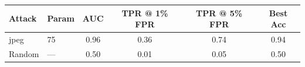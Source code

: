 \begin{tabular}{llcccc}
\toprule
Attack & Param & AUC & TPR @ 1\% FPR & TPR @ 5\% FPR & Best Acc \\
\midrule
jpeg & 75 & 0.96 & 0.36 & 0.74 & 0.94 \\
Random & — & 0.50 & 0.01 & 0.05 & 0.50 \\
\bottomrule
\end{tabular}
